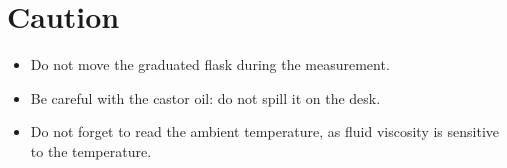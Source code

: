 \section{Caution}
\begin{itemize}
\item Do not move the graduated flask during the measurement.
\item Be careful with the castor oil: do not spill it on the desk.  
\item Do not forget to read the ambient temperature, as fluid viscosity is
  sensitive to the temperature. 
\end{itemize}

